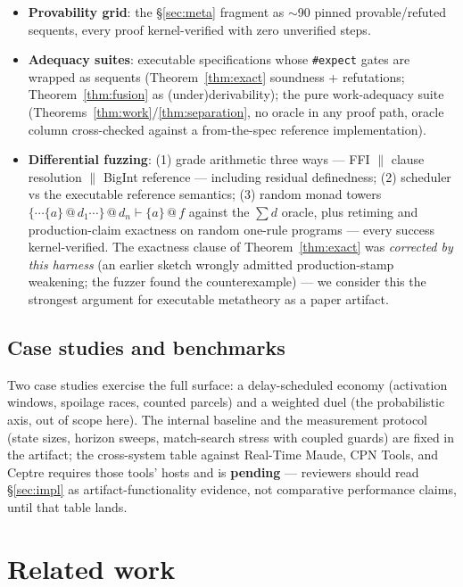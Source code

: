 \documentclass[11pt]{article}
\makeatletter
\newcommand{\lax}[2]{\{#1\}\mathbin{@}#2}       %
\theoremstyle{definition}
\theoremstyle{remark}
\makeatother
\begin{document}
\begin{itemize}
\item \textbf{Provability grid}: the \S\ref{sec:meta} fragment as $\sim$90
  pinned provable/refuted sequents, every proof kernel-verified with zero
  unverified steps.
\item \textbf{Adequacy suites}: executable specifications whose
  \texttt{\#expect} gates are wrapped as sequents
  (Theorem~\ref{thm:exact} soundness + refutations;
  Theorem~\ref{thm:fusion} as (under)derivability); the pure work-adequacy
  suite (Theorems~\ref{thm:work}/\ref{thm:separation}, no oracle in any proof
  path, oracle column cross-checked against a from-the-spec reference
  implementation).
\item \textbf{Differential fuzzing}: (1) grade arithmetic three ways --- FFI
  $\|$ clause resolution $\|$ BigInt reference --- including residual
  definedness; (2) scheduler vs the executable reference semantics; (3) random
  monad towers $\lax{\cdots\lax{a}{d_1}\cdots}{d_n} \vdash \lax{a}{f}$ against
  the $\sum d$ oracle, plus retiming and production-claim exactness on random
  one-rule programs --- every success kernel-verified.  The exactness clause of
  Theorem~\ref{thm:exact} was \emph{corrected by this harness} (an earlier
  sketch wrongly admitted production-stamp weakening; the fuzzer found the
  counterexample) --- we consider this the strongest argument for executable
  metatheory as a paper artifact.
\end{itemize}

\subsection{Case studies and benchmarks}

Two case studies exercise the full surface: a delay-scheduled economy
(activation windows, spoilage races, counted parcels) and a weighted duel (the
probabilistic axis, out of scope here).  The internal baseline and the
measurement protocol (state sizes, horizon sweeps, match-search stress with
coupled guards) are fixed in the artifact; the cross-system table against
Real-Time Maude, CPN Tools, and Ceptre requires those tools' hosts and is
\textbf{pending} --- reviewers should read \S\ref{sec:impl} as
artifact-functionality evidence, not comparative performance claims, until that
table lands.

\section{Related work}
\label{sec:related}
\end{document}
